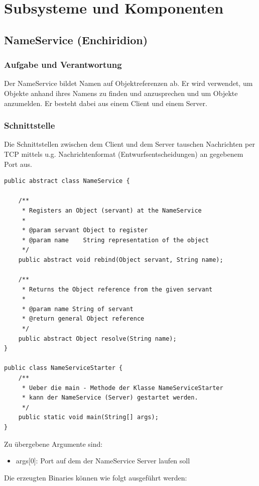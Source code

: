 \documentclass{article}
\begin{document}
\newpage

\section{Subsysteme und Komponenten}

\subsection{NameService (Enchiridion)}
\subsubsection{Aufgabe und Verantwortung}
Der NameService bildet Namen auf Objektreferenzen ab. Er wird verwendet, um Objekte anhand
ihres Namens zu finden und anzusprechen und um Objekte anzumelden. Er besteht dabei aus einem Client und einem Server.

\subsubsection{Schnittstelle}
Die Schnittstellen zwischen dem Client und dem Server tauschen Nachrichten per TCP mittels
u.g. Nachrichtenformat (Entwurfsentscheidungen) an gegebenem Port aus.
\begin{lstlisting}
public abstract class NameService {

    /**
     * Registers an Object (servant) at the NameService
     *
     * @param servant Object to register
     * @param name    String representation of the object
     */
    public abstract void rebind(Object servant, String name);

    /**
     * Returns the Object reference from the given servant
     *
     * @param name String of servant
     * @return general Object reference
     */
    public abstract Object resolve(String name);
}

public class NameServiceStarter {
    /**
     * Ueber die main - Methode der Klasse NameServiceStarter
     * kann der NameService (Server) gestartet werden.
     */
    public static void main(String[] args);
}
\end{lstlisting}
Zu übergebene Argumente sind:
\begin{itemize}
	\item args[0]: Port auf dem der NameService Server laufen soll
\end{itemize}

Die erzeugten Binaries können wie folgt ausgeführt werden:\\
\end{document}
